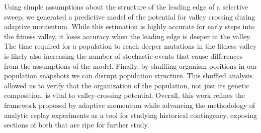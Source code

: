 Using simple assumptions about the structure of the leading edge of a selective sweep, we generated a predictive model of the potential for valley crossing during adaptive momentum. 
While this estimation is highly accurate for early steps into the fitness valley, it loses accuracy when the leading edge is deeper in the valley. 
The time required for a population to reach deeper mutations in the fitness valley is likely also increasing the number of stochastic events that cause differences from the assumptions of the model. 
Finally, by shuffling organism positions in our population snapshots we can disrupt population structure.
This shuffled analysis allowed us to verify that the organization of the population, not just its genetic composition, is vital to valley-crossing potential. 
Overall, this work refines the framework proposed by adaptive momentum while advancing the methodology of analytic replay experiments as a tool for studying historical contingency, exposing sections of both that are ripe for further study. 






